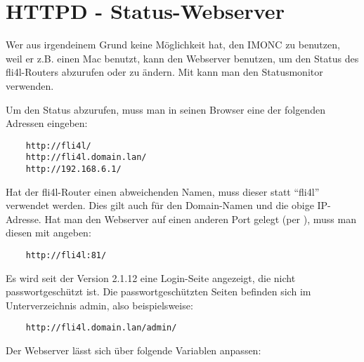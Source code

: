 
\section{HTTPD - Status-Webserver}


  Wer aus irgendeinem Grund keine Möglichkeit hat, den IMONC zu benutzen,
  weil er z.B. einen Mac benutzt, kann den Webserver benutzen, um den
  Status des fli4l-Routers abzurufen oder zu ändern. Mit 
  kann man den Statusmonitor verwenden.

  Um den Status abzurufen, muss man in seinen Browser eine der folgenden
  Adressen eingeben:

\begin{example}
\begin{verbatim}
    http://fli4l/
    http://fli4l.domain.lan/
    http://192.168.6.1/
\end{verbatim}
\end{example}

  Hat der fli4l-Router einen abweichenden Namen, muss dieser statt ``fli4l''
  verwendet werden. Dies gilt auch für den Domain-Namen und die obige
  IP-Adresse. Hat man den Webserver auf einen anderen Port gelegt (per
  ), muss man diesen mit angeben:

\begin{example}
\begin{verbatim}
    http://fli4l:81/
\end{verbatim}
\end{example}

  Es wird seit der Version 2.1.12 eine Login-Seite angezeigt, die nicht
  passwortgeschützt ist. Die passwortgeschützten Seiten befinden sich im
  Unterverzeichnis admin, also beispielsweise:
\begin{example}
\begin{verbatim}
    http://fli4l.domain.lan/admin/
\end{verbatim}
\end{example}

   Der Webserver lässt sich über folgende Variablen anpassen:

